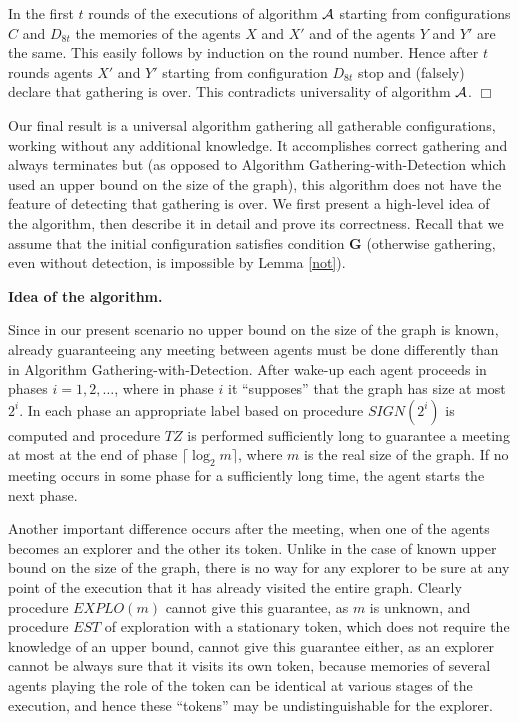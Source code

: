 \documentclass[11pt]{article}
\newcommand{\qed}{\hfill $\Box$ \bigbreak}
\newenvironment{proof}{\noindent {\bf Proof.}}{\qed}
\newcommand{\cA}{{\cal A}}
\begin{document}
\begin{proof}
In the first $t$ rounds of the executions of algorithm $\cA$ starting from configurations $C$ and $D_{8t}$ the memories of the agents $X$ and $X'$ and
of the agents $Y$ and $Y'$ are 
the same. This easily follows by induction on the round number. Hence after $t$ rounds agents $X'$ and $Y'$ starting from configuration  $D_{8t}$ stop and (falsely)
declare that gathering is over. This contradicts universality of algorithm $\cA$.
\end{proof}

Our final result is a universal algorithm gathering all gatherable configurations, working without any additional knowledge. It accomplishes correct gathering
and always terminates but (as opposed to Algorithm Gathering-with-Detection which used an upper bound on the size of the graph), this algorithm does not
have the feature of detecting that gathering is over. We first present a high-level idea of the algorithm, then describe it in detail and prove its correctness.
Recall that we assume that the initial configuration satisfies condition {\bf G} (otherwise gathering, even without detection,  is impossible by Lemma \ref{not}).

 \vspace*{0.2cm}

\noindent
{\bf Idea of the algorithm.}

Since in our present scenario no upper bound on the size of the graph is known, already guaranteeing any meeting between agents must be done 
differently than in Algorithm Gathering-with-Detection. After wake-up each agent proceeds in phases {$i=1,2,\dots$}, where in phase $i$ it ``supposes'' that the graph
has size at most $2^i$.  In each phase an appropriate label based on procedure $SIGN(2^i)$ is computed and procedure $TZ$ is performed sufficiently long to guarantee
a meeting at most at the end of phase {$\lceil \log_2 m \rceil$}, where $m$ is the real size of the graph. If no meeting occurs in some phase for a sufficiently long time, the agent starts the next phase.

Another important difference occurs after the meeting, when one of the agents becomes an explorer and the other its token.  Unlike in the case of known upper bound
on the size of the graph, 
there is no way for any explorer to be sure at any point of the execution that it has already visited the entire graph. Clearly procedure $EXPLO(m)$ cannot give this guarantee, as $m$ is unknown, and procedure $EST$ of exploration with a stationary token, which does not require the knowledge of an upper bound, cannot give this guarantee either, as an explorer cannot be always sure that it visits its own token, because memories of several agents playing the role of the token can be 
identical at various stages of the execution, and hence these ``tokens'' may be undistinguishable for the explorer. 
\end{document}
